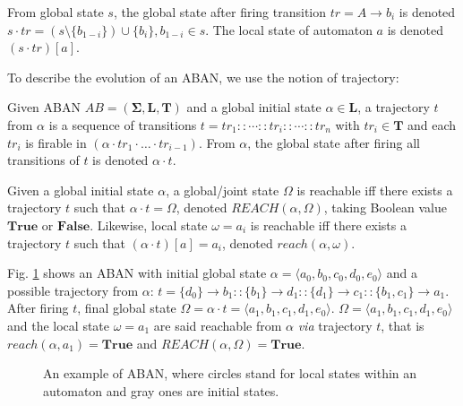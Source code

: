 \documentclass[runningheads]{llncs}
\newcommand{\acm}[3]{\{#1\}\rightarrow#3}
\begin{document}
\begin{definition}[Dynamics]
    From global state $s$, the global state after firing transition $tr=A\to b_i$ is denoted $s \cdot tr = (s \setminus \{b_{1-i}\}) \cup \{b_{i}\}, b_{1-i} \in s$.
    The local state of automaton $a$ is denoted $(s\cdot tr)[a]$.
\end{definition}
To describe the evolution of an ABAN, we use the notion of trajectory:
\begin{definition}[Trajectory]
Given ABAN $AB = (\mathbf{\Sigma},\mathbf{L},\mathbf{T})$ and a global initial state $\alpha\in \mathbf{L}$, a trajectory $t$ from $\alpha$ is a sequence of transitions $t=tr_1::\cdots :: tr_i::\cdots ::tr_n$ with $tr_i\in\mathbf{T}$ and each $tr_i$ is firable in $(\alpha \cdot tr_1 \cdot \ldots \cdot tr_{i-1})$.
From $\alpha$, the global state after firing all transitions of $t$ is denoted $\alpha \cdot t$.
\end{definition}

\begin{definition}[Reachability]
Given a global initial state $\alpha$, a global/joint state $\Omega$ is reachable iff there exists a trajectory $t$ such that $\alpha\cdot t=\Omega$, denoted $REACH(\alpha, \Omega)$, taking Boolean value $\mathbf{True}$ or $\mathbf{False}$.
Likewise, local state $\omega=a_i$ is reachable iff there exists a trajectory $t$ such that $(\alpha\cdot t)[a]=a_i$, denoted $reach(\alpha, \omega)$.
\end{definition}
\begin{example}\label{example:aban}
Fig. \ref{fig:1} shows an ABAN with initial global state $\alpha=\langle a_0,b_0,c_0,d_0,e_0\rangle$ and a possible trajectory from $\alpha$: $t=\acm{d_0}{b_0}{b_1}::\acm{b_1}{d_0}{d_1}::\acm{d_1}{c_0}{c_1}::\acm{b_1,c_1}{a_0}{a_1}$. After firing $t$, final global state $\Omega=\alpha\cdot t=\langle a_1,b_1,c_1,d_1,e_0\rangle$.
$\Omega=\langle a_1,b_1,c_1,d_1,e_0\rangle$ and the local state $\omega=a_1$ are said reachable from $\alpha$ \textit{via} trajectory $t$, that is $reach(\alpha,a_1)=\mathbf{True}$ and $REACH(\alpha,\Omega)=\mathbf{True}$.
\end{example}
\begin{figure}[ht]
\centering

\caption{An example of ABAN, where circles stand for local states within an automaton and gray ones are initial states.}\label{fig:1}
\end{figure}	
\end{document}
